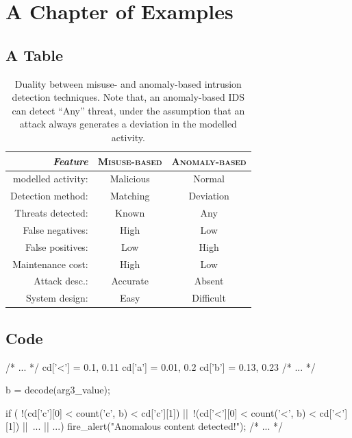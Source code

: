 \chapter{A Chapter of Examples}
\label{chapter1}

\section{A Table}

\begin{table}[h]
\centering
\begin{tabular}{rcc}
\toprule \emph{Feature} & \textsc{Misuse-based} &
\textsc{Anomaly-based}\\
    
\midrule modelled activity: & Malicious & Normal\\
Detection method: & Matching & Deviation\\
Threats detected: & Known & Any\\
False negatives: & High & Low\\
False positives: & Low & High\\
Maintenance cost: & High & Low\\
Attack desc.: & Accurate & Absent\\
System design: & Easy & Difficult\\
\bottomrule
\end{tabular}
\caption[Duality between misuse- and anomaly-based intrusion detection techniques.]{Duality between misuse- and anomaly-based intrusion detection techniques. Note that, an anomaly-based \ac{IDS} can detect ``Any'' threat, under the assumption that an attack always generates a deviation in the modelled activity.}
\label{tab:misuse-vs-anomaly}
\end{table}


\section{Code}

\begin{pseudoc}
  /* ... */ cd['<'] = {0.1, 0.11} cd['a'] = {0.01, 0.2} cd['b'] =
  {0.13, 0.23} /* ... */

  b = decode(arg3_value);
  
  if ( !(cd['c'][0] < count('c', b) < cd['c'][1]) ||\
       !(cd['<'][0] < count('<', b) < cd['<'][1]) ||\
       ... || ...)  fire_alert("Anomalous content detected!");
  /* ... */
\end{pseudoc}

